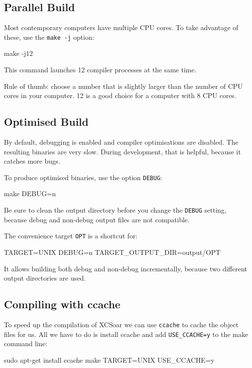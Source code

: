 \subsection{Parallel Build}

Most contemporary computers have multiple CPU cores.  To take
advantage of these, use the \texttt{make -j} option:

\begin{verbatim*}
make -j12
\end{verbatim*}

This command launches 12 compiler processes at the same time.

Rule of thumb: choose a number that is slightly larger than the number
of CPU cores in your computer.  12 is a good choice for a computer
with 8 CPU cores.

\subsection{Optimised Build}

By default, debugging is enabled and compiler optimisations are
disabled.  The resulting binaries are very slow.  During development,
that is helpful, because it catches more bugs.

To produce optimised binaries, use the option \texttt{DEBUG}:

\begin{verbatim*}
make DEBUG=n
\end{verbatim*}

Be sure to clean the output directory before you change the
\texttt{DEBUG} setting, because debug and non-debug output files are
not compatible.

The convenience target \texttt{OPT} is a shortcut for:

\begin{verbatim*}
TARGET=UNIX DEBUG=n TARGET_OUTPUT_DIR=output/OPT
\end{verbatim*}

It allows building both debug and non-debug incrementally, because two
different output directories are used.

\subsection{Compiling with ccache}

To speed up the compilation of XCSoar we can use \texttt{ccache} to cache the 
object files for us. All we have to do is install ccache and 
add 
\texttt{USE\_CCACHE=y} 
to the make command line:

\begin{verbatim*}
sudo apt-get install ccache
make TARGET=UNIX USE_CCACHE=y
\end{verbatim*}
